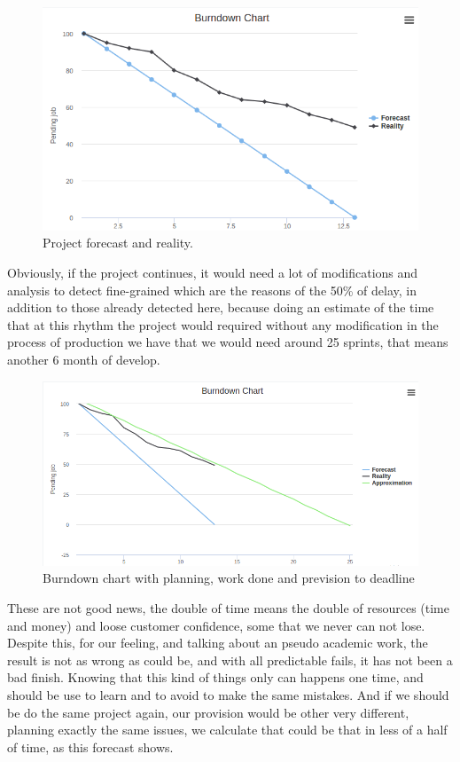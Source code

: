 \begin{figure}[H]
  \includegraphics[scale=0.45]{img/graphics/burndown2.png}
  \centering
  \caption{Project forecast and reality.}
\end{figure}

\noindent Obviously, if the project continues, it would need a lot of
modifications and analysis to detect fine-grained which are the reasons
of the 50\% of delay, in addition to those already detected here,
because doing an estimate of the time that at this rhythm the project would required
without any modification in the process of production we have that we would need
around 25 sprints, that means another 6 month of develop.

\begin{figure}[H]
  \includegraphics[scale=0.45]{img/graphics/burndown3.png}
  \centering
  \caption{Burndown chart with planning, work done and prevision to deadline}
\end{figure}

\noindent These are not good news, the double of time means the double of resources (time and
money) and loose customer confidence, some that we never can not lose.
Despite this, for our feeling, and talking about an pseudo academic work,
the result is not as wrong as could be, and with all predictable fails,
it has not been a bad finish. Knowing that this kind of things only can happens
one time, and should be use to learn and to avoid to make the same mistakes.
\intro
And if we should be do the same project again, our provision would be other
very different, planning exactly the same issues, we calculate that could be
that in less of a half of time, as this forecast shows.

